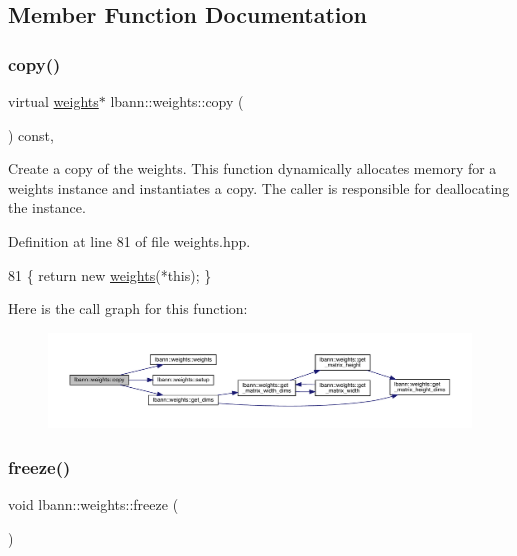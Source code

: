\subsection{Member Function Documentation}
\mbox{\label{classlbann_1_1weights_a1a85fa681dcac2dbead2e5012099f380}} 
\subsubsection{\texorpdfstring{copy()}{copy()}}
{\footnotesize\ttfamily virtual \hyperlink{classlbann_1_1weights}{weights}$\ast$ lbann\+::weights\+::copy (\begin{DoxyParamCaption}{ }\end{DoxyParamCaption}) const\hspace{0.3cm}{\ttfamily [inline]}, {\ttfamily [virtual]}}

Create a copy of the weights. This function dynamically allocates memory for a weights instance and instantiates a copy. The caller is responsible for deallocating the instance. 

Definition at line 81 of file weights.\+hpp.


\begin{DoxyCode}
81 \{ \textcolor{keywordflow}{return} \textcolor{keyword}{new} \hyperlink{classlbann_1_1weights_a21a3a3f1806197d10619a1450871e066}{weights}(*\textcolor{keyword}{this}); \}
\end{DoxyCode}
Here is the call graph for this function\+:\nopagebreak
\begin{figure}[H]
\begin{center}
\leavevmode
\includegraphics[width=350pt]{classlbann_1_1weights_a1a85fa681dcac2dbead2e5012099f380_cgraph}
\end{center}
\end{figure}
\mbox{\label{classlbann_1_1weights_ab9fe32e21ae25f6b000497addb46351f}} 
\subsubsection{\texorpdfstring{freeze()}{freeze()}}
{\footnotesize\ttfamily void lbann\+::weights\+::freeze (\begin{DoxyParamCaption}{ }\end{DoxyParamCaption})\hspace{0.3cm}{\ttfamily [inline]}}



